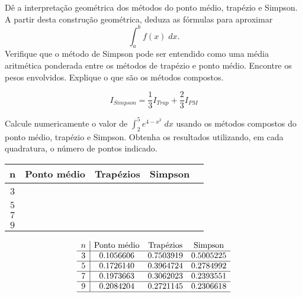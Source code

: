 \begin{exer}
 Dê a interpretação geométrica dos métodos do ponto médio, trapézio e Simpson. A partir desta construção geométrica, deduza as fórmulas para aproximar
 \begin{equation} \int_a^bf(x)\;dx. \end{equation}
 Verifique que o método de Simpson pode ser entendido como uma média aritmética ponderada entre os métodos de trapézio e ponto médio. Encontre os pesos envolvidos. Explique o que são os métodos compostos.
 \end{exer}
\begin{resp}
\begin{equation}
  I_{Simpson}= \frac{1}{3} I_{Trap}+ \frac{2}{3}I_{PM}
\end{equation}
\end{resp}


\begin{exer}
Calcule numericamente o valor de $\int_2^5e^{4-x^2}\;dx$ usando os métodos compostos do ponto médio, trapézio e Simpson. Obtenha os resultados utilizando, em cada quadratura, o número de pontos indicado.
\begin{center}
\begin{tabular}{|c|c|c|c|c|}
\hline
n   & Ponto médio & Trapézios & Simpson \\
\hline
$3$ &~\hspace{40pt}~& ~\hspace{40pt}~& ~\hspace{40pt}\\
\hline
$5 $ & & & \\
\hline
$7 $ & & &\\
\hline
$9$  & & &\\
\hline
\end{tabular}
\end{center}
\end{exer}
\begin{resp}
    \begin{equation}
    \begin{array}{c|cccc}
        n   & \text{Ponto médio} & \text{Trapézios} & \text{Simpson} \\  \hline
        3 & 0.1056606  &  0.7503919  &  0.5005225  \\  \hline
        5 & 0.1726140 &   0.3964724  &  0.2784992   \\\hline
        7 & 0.1973663 &   0.3062023  &  0.2393551  \\ \hline
        9  &  0.2084204 &   0.2721145  &  0.2306618  \\ \hline
    \end{array}
    \end{equation}
\end{resp}




